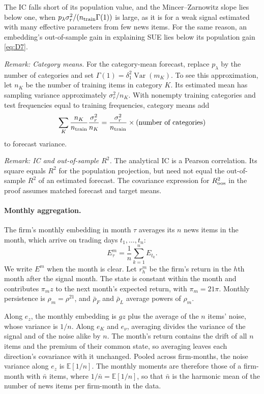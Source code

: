 \documentclass[11pt,letterpaper]{article}
\theoremstyle{remark}
\DeclareMathOperator{\Var}{Var}
\begin{document}
The IC falls short of its population value, and the Mincer--Zarnowitz slope lies below one, when $p_\lambda\sigma_r^2/(n_{\rm train}\Gamma(1))$ is large, as it is for a weak signal estimated with many effective parameters from few news items. For the same reason, an embedding's out-of-sample gain in explaining SUE lies below its population gain \eqref{eq:D7}.

\emph{Remark: Category means.}
For the category-mean forecast, replace $p_\lambda$ by the number of categories and set $\Gamma(1)=\delta_1^2\Var(m_K)$. To see this approximation, let $n_K$ be the number of training items in category $K$. Its estimated mean has sampling variance approximately $\sigma_r^2/n_K$. With nonempty training categories and test frequencies equal to training frequencies, category means add
\[
\sum_K\frac{n_K}{n_{\rm train}}\frac{\sigma_r^2}{n_K}
=\frac{\sigma_r^2}{n_{\rm train}}
\times(\text{number of categories})
\]
to forecast variance.

\emph{Remark: IC and out-of-sample $R^2$.}
The analytical IC is a Pearson correlation. Its square equals $R^2$ for the population projection, but need not equal the out-of-sample $R^2$ of an estimated forecast. The covariance expression for $R^2_{\rm oos}$ in the proof assumes matched forecast and target means.

\paragraph{Monthly aggregation.}
The firm's monthly embedding in month $\tau$ averages its $n$ news items in the month, which arrive on trading days $t_1,\ldots,t_n$:
\[
E^m_\tau=\frac{1}{n}\sum_{k=1}^{n}E_{t_k}.
\]
We write $E^m$ when the month is clear. Let $r^m_h$ be the firm's return in the $h$th month after the signal month. The state is constant within the month and contributes $\pi_m z$ to the next month's expected return, with $\pi_m=21\pi$. Monthly persistence is $\rho_m=\rho^{21}$, and $\bar\rho_F$ and $\bar\rho_L$ average powers of $\rho_m$.

Along $e_z$, the monthly embedding is $gz$ plus the average of the $n$ items' noise, whose variance is $1/n$. Along $e_K$ and $e_\nu$, averaging divides the variance of the signal and of the noise alike by $n$. The month's return contains the drift of all $n$ items and the premium of their common state, so averaging leaves each direction's covariance with it unchanged. Pooled across firm-months, the noise variance along $e_z$ is $\mathbb E[1/n]$. The monthly moments are therefore those of a firm-month with $\bar n$ items, where $1/\bar n=\mathbb E[1/n]$, so that $\bar n$ is the harmonic mean of the number of news items per firm-month in the data.
\end{document}
